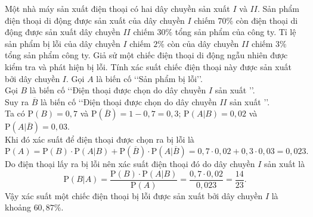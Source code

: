 \begin{bt}%
	Một nhà máy sản xuất điện thoại có hai dây chuyền sản xuất $I$ và $II$. Sản phẩm điện thoại di động được sản xuất của dây chuyền $I$ chiếm $70\%$ còn điện thoại di động được sản xuất dây chuyền $II$ chiếm $30\%$ tổng sản phẩm của công ty. Tỉ lệ sản phẩm bị lỗi của dây chuyền $I$ chiếm $2\%$ còn của dây chuyền $II$ chiếm $3\%$ tổng sản phẩm công ty. Giả sử một chiếc điện thoại di động ngẫu nhiên được kiểm tra và phát hiện bị lỗi. Tính xác suất chiếc điện thoại này được sản xuất bởi dây chuyền  $I$.
	Gọi $A$ là biến cố \lq\lq Sản phẩm bị lỗi\rq\rq.\\ 
	Gọi $B$ là biến cố \lq\lq Điện thoại được chọn do dây  chuyền $I$ sản xuất \rq\rq .\\
	Suy ra $\overline{B}$ là biến cố \lq\lq Điện thoại được chọn do dây chuyền  $II$ sản xuất \rq\rq .\\
	Ta có $\mathrm{P} \left(B\right)=0{,}7$ và $\mathrm{P} \left(\overline{B}\right)=1-0{,}7=0{,}3$; $\mathrm{P}  \left(A|B\right)=0{,}02$ và $\mathrm{P} \left(A|\overline{B}\right)=0{,}03$.\\
	 Khi đó xác suất để điện thoại được chọn ra bị lỗi là
	\[\mathrm{P} \left(A\right)=\mathrm{P} \left(B\right) \cdot \mathrm{P}\left(A|B\right)+\mathrm{P}  \left(\overline{B}\right) \cdot \mathrm{P} \left(A|\overline{B}\right)=0{,}7 \cdot 0{,}02+0{,}3 \cdot 0{,}03=0{,}023.\]
	Do điện thoại lấy  ra bị lỗi nên xác suất điện thoại đó do dây chuyền $I$ sản xuất là\\
	\[\mathrm{P} \left(B|A\right)=\dfrac{\mathrm{P} \left(B\right) \cdot \mathrm{P}\left(A|B\right)}{\mathrm{P}\left(A\right)}=\dfrac{0{,}7  \cdot 0{,}02}{0{,}023}=\dfrac{14}{23}.\]
	Vậy xác suất một chiếc điện  thoại bị lỗi được sản xuất bởi dây chuyền $I$ là khoảng $60{,}87\%$.
\end{bt}

